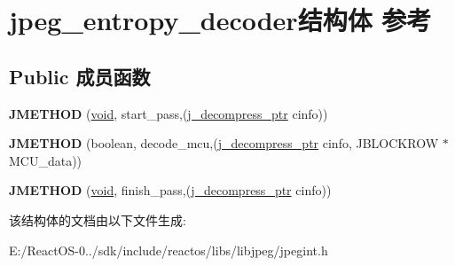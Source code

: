 \hypertarget{structjpeg__entropy__decoder}{}\section{jpeg\+\_\+entropy\+\_\+decoder结构体 参考}
\label{structjpeg__entropy__decoder}
\subsection*{Public 成员函数}
\begin{DoxyCompactItemize}
\item 
\mbox{\label{structjpeg__entropy__decoder_ab1b90e7d9348599cecc7b6c86d291ae4}} 
{\bfseries J\+M\+E\+T\+H\+OD} (\hyperlink{interfacevoid}{void}, start\+\_\+pass,(\hyperlink{structjpeg__decompress__struct}{j\+\_\+decompress\+\_\+ptr} cinfo))
\item 
\mbox{\label{structjpeg__entropy__decoder_a151f6f7497ba68935cca4b28ee75a596}} 
{\bfseries J\+M\+E\+T\+H\+OD} (boolean, decode\+\_\+mcu,(\hyperlink{structjpeg__decompress__struct}{j\+\_\+decompress\+\_\+ptr} cinfo, J\+B\+L\+O\+C\+K\+R\+OW $\ast$M\+C\+U\+\_\+data))
\item 
\mbox{\label{structjpeg__entropy__decoder_af016a41a26657b3f056b2edbc0d24014}} 
{\bfseries J\+M\+E\+T\+H\+OD} (\hyperlink{interfacevoid}{void}, finish\+\_\+pass,(\hyperlink{structjpeg__decompress__struct}{j\+\_\+decompress\+\_\+ptr} cinfo))
\end{DoxyCompactItemize}


该结构体的文档由以下文件生成\+:\begin{DoxyCompactItemize}
\item 
E\+:/\+React\+O\+S-\/0../sdk/include/reactos/libs/libjpeg/jpegint.\+h\end{DoxyCompactItemize}
